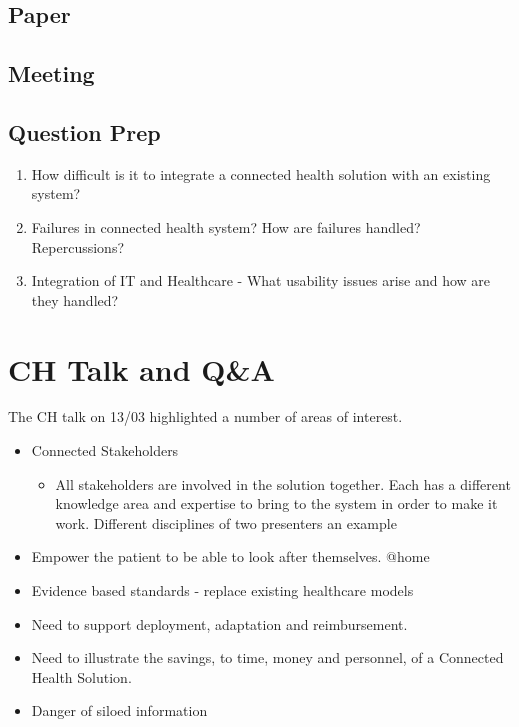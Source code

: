 \section{Paper}

\section{Meeting}

\section{Question Prep}
\begin{enumerate}
\item How difficult is it to integrate a connected health solution with an existing system?
\item Failures in connected health system? How are failures handled? Repercussions?
\item Integration of IT and Healthcare - What usability issues arise and how are they handled?
\end{enumerate}

\chapter{CH Talk and Q\&A}

The CH talk on 13/03 highlighted a number of areas of interest.

\begin{itemize}
\item Connected Stakeholders
\begin{itemize}
\item All stakeholders are involved in the solution together. Each has a different knowledge area and expertise to bring to the system in order to make it work. Different disciplines of two presenters an example
\end{itemize}
\item Empower the patient to be able to look after themselves. @home
\item Evidence based standards - replace existing healthcare models
\item Need to support deployment, adaptation and reimbursement.
\item Need to illustrate the savings, to time, money and personnel, of a Connected Health Solution.
\item Danger of siloed information
\end{itemize}

